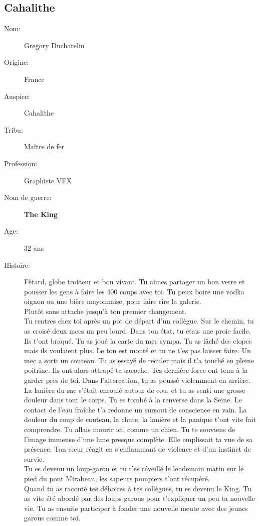 \documentclass[oneside,12pt]{book}
\newcommand{\King}{\textbf{The King} }
\begin{document}
\begin{flushleft}
\section{Cahalithe}
\begin{description}
\item[Nom:]{Gregory Duchatelin}
\item[Origine:]{France}
\item[Auspice:]{Cahalithe}
\item[Tribu:]{Maître de fer}
\item[Profession:]{Graphiste VFX}
\item[Nom de guerre:]{\King}
\item[Age:]{32 ans}
\item[Histoire:]{ 
Fêtard, globe trotteur et bon vivant. Tu aimes partager un bon verre et pousser les gens à faire les 400 coups avec toi. Tu peux boire une vodka oignon ou une bière mayonnaise, pour faire rire la galerie. \\
Plutôt sans attache jusqu'à ton premier changement. \\
Tu rentres chez toi après un pot de départ d'un collègue. Sur le chemin, tu as croisé deux mecs un peu lourd. Dans ton état, tu étais une proie facile. Ils t'ont braqué. Tu as joué la carte du mec sympa. Tu as lâché des clopes mais ils voulaient plus. Le ton est monté et tu ne t'es pas laisser faire. Un mec a sorti un couteau. Tu as essayé de reculer mais il t'a touché en pleine poitrine. Ils ont alors attrapé ta sacoche. Tes dernière force ont tenu à la garder près de toi. Dans l'altercation, tu as poussé violemment en arrière.\\
La lanière du sac s'était enroulé autour de cou, et tu as senti une grosse douleur dans tout le corps. Tu es tombé à la renverse dans la Seine. Le contact de l'eau fraîche t'a redonne un sursaut de conscience en vain. La douleur du coup de couteau, la chute, la lanière et la panique t'ont vite fait comprendre. Tu allais mourir ici, comme un chien. Tu te souviens de l'image immense d'une lune presque complète. Elle emplissait ta vue de sa présence. Ton cœur réagit en s’enflammant de violence et d’un instinct de survie.\\
Tu es devenu un loup-garou et tu t'es réveillé le lendemain matin sur le pied du pont Mirabeau, les sapeurs pompiers t'ont récupéré.\\
Quand tu as raconté tes déboires à tes collègues, tu es devenu le King. Tu as vite été abordé par des loups-garous pour t'expliquer un peu ta nouvelle vie. Tu as ensuite participer à fonder une nouvelle meute avec des jeunes garous comme toi.\\
}
\end{description}
\end{flushleft}
\end{document}
